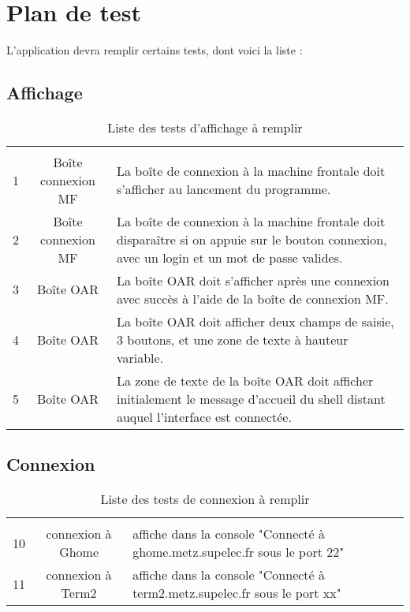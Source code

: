 
\section{Plan de test}
\label{sec:plan-de-test}


\par L'application devra remplir certains tests, dont voici la liste :

\subsection{Affichage}
\label{sec:affichage}

\begin{table}[h!]
  \centering
  \begin{tabular}[h!]{|c|c|p{10cm}|}
    \hline \\
    1 & Boîte connexion MF & La boîte de connexion à la machine frontale doit s'afficher au lancement du programme. \\
    2 & Boîte connexion MF & La boîte de connexion à la machine frontale doit disparaître si on appuie sur le bouton connexion, avec un login et un mot de passe valides.\\
    3 & Boîte OAR & La boîte OAR doit s'afficher après une connexion avec succès à l'aide de la boîte de connexion MF. \\
    4 & Boîte OAR & La boîte OAR doit afficher deux champs de saisie, 3 boutons, et une zone de texte à hauteur variable. \\
    5 & Boîte OAR & La zone de texte de la boîte OAR doit afficher initialement le message d'accueil du shell distant auquel l'interface est connectée. \\

    \hline    
  \end{tabular}
  \caption{Liste des tests d'affichage à remplir}
  \label{tab:tests_affichage}
\end{table}

\subsection{Connexion}
\label{sec:connexion}

\begin{table}[h!]
  \centering
  \begin{tabular}[h!]{|c|c|p{10cm}|}
\hline \\
    10 & connexion à Ghome & affiche dans la console "Connecté à ghome.metz.supelec.fr sous le port 22"\\
    11 & connexion à Term2 & affiche dans la console "Connecté à term2.metz.supelec.fr sous le port xx"\\
\hline
  \end{tabular}
  \caption{Liste des tests de connexion à remplir}
  \label{tab:tests_connexion}
\end{table}

